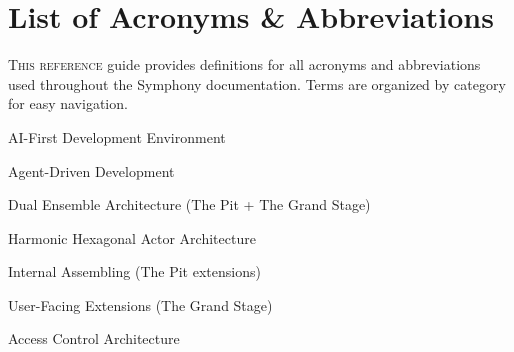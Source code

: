 
\section{List of Acronyms \& Abbreviations}
\label{sec:Acronyms}

\lettrine{T}{his reference} guide provides definitions for all acronyms and abbreviations used throughout the Symphony documentation. Terms are organized by category for easy navigation.

\vspace{0.5cm}

\begin{infobox}[title=Symphony Core Architecture]
\begin{description}[leftmargin=3.5cm,labelwidth=3cm,labelsep=0.5cm,itemsep=3pt]
\item[\textbf{AIDE}] AI-First Development Environment
\item[\textbf{ADD}] Agent-Driven Development
\item[\textbf{DEA}] Dual Ensemble Architecture (The Pit + The Grand Stage)
\item[\textbf{H²A²}] Harmonic Hexagonal Actor Architecture
\item[\textbf{IaE}] Internal Assembling (The Pit extensions)
\item[\textbf{UFE}] User-Facing Extensions (The Grand Stage)
\item[\textbf{ACA}] Access Control Architecture
\end{description}
\end{infobox}

